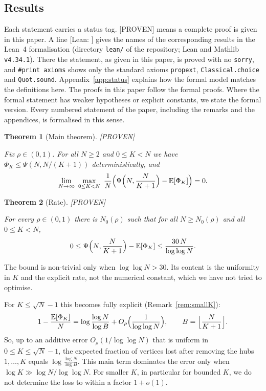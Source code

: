 \documentclass[11pt]{amsart}
\newtheorem{theorem}{Theorem}[section]
\theoremstyle{definition}
\newcommand{\E}{\mathbb{E}}
\newcommand{\status}[1]{\textup{\textsf{[#1]}}}
\newcommand{\lean}[1]{\ifhmode\unskip\par\fi{\noindent\footnotesize\raggedright\textup{\textsf{Lean:}}\ \texttt{\detokenize{#1}}\par}}
\newcommand{\leanname}[1]{\textup{\textsf{[Lean: {\footnotesize\texttt{\detokenize{#1}}}]}}}
\begin{document}
\subsection{Results}
Each statement carries a status tag. \status{PROVEN} means a complete proof is given in this paper. A line \leanname{name} gives the names of the corresponding results in the Lean~4 formalisation (directory \texttt{lean/} of the repository; Lean and Mathlib \texttt{v4.34.1}). There the statement, as given in this paper, is proved with no \texttt{sorry}, and \texttt{\#print axioms} shows only the standard axioms \texttt{propext}, \texttt{Classical.choice} and \texttt{Quot.sound}. Appendix~\ref{app:status} explains how the formal model matches the definitions here. The proofs in this paper follow the formal proofs. Where the formal statement has weaker hypotheses or explicit constants, we state the formal version. Every numbered statement of the paper, including the remarks and the appendices, is formalised in this sense.

\begin{theorem}[Main theorem]\label{thm:main}\status{PROVEN}\lean{thm_main}
Fix $\rho\in(0,1)$. For all $N\ge2$ and $0\le K<N$ we have $\Phi_K\le \Psi(N,N/(K+1))$ deterministically, and
\[
\lim_{N\to\infty}\ \max_{0\le K<N}\ \frac1N\Bigl(\Psi\Bigl(N,\frac N{K+1}\Bigr)-\E[\Phi_K]\Bigr)=0 .
\]
\end{theorem}

\begin{theorem}[Rate]\label{thm:rate}\status{PROVEN}\lean{thm_rate}
For every $\rho\in(0,1)$ there is $N_0(\rho)$ such that for all $N\ge N_0(\rho)$ and all $0\le K<N$,
\[
0\le \Psi\Bigl(N,\frac N{K+1}\Bigr)-\E[\Phi_K]\le \frac{30\,N}{\log\log N}.
\]
\end{theorem}

The bound is non-trivial only when $\log\log N>30$. Its content is the uniformity in $K$ and the explicit rate, not the numerical constant, which we have not tried to optimise.

For $K\le\sqrt N-1$ this becomes fully explicit (Remark~\ref{rem:smallK}):
\begin{equation}\label{eq:smallK}
1-\frac{\E[\Phi_K]}{N}=\log\frac{\log N}{\log B}+O_\rho\Bigl(\frac1{\log\log N}\Bigr),\qquad B=\Bigl\lfloor\frac N{K+1}\Bigr\rfloor .
\end{equation}
So, up to an additive error $O_\rho(1/\log\log N)$ that is uniform in $0\le K\le\sqrt N-1$, the expected fraction of vertices lost after removing the hubs $1,\dots,K$ equals $\log\frac{\log N}{\log B}$. This main term dominates the error only when $\log K\gg\log N/\log\log N$. For smaller $K$, in particular for bounded $K$, we do not determine the loss to within a factor $1+o(1)$.
\end{document}
